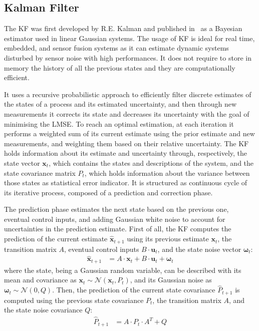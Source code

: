 \subsection{Kalman Filter}

\noindent The \gls{KF} was first developed by R.E. Kalman and published in~\cite{kalman} as a Bayesian estimator used in linear Gaussian systems.
The usage of \gls{KF} is ideal for real time, embedded, and sensor fusion systems as it can estimate dynamic systems disturbed by sensor noise with high performances.
It does not require to store in memory the history of all the previous states and they are computationally efficient.

It uses a recursive probabilistic approach to efficiently filter discrete estimates of the states of a process and its estimated uncertainty, and then through new measurements it corrects its state and decreases its uncertainty with the goal of minimising the \gls{LMSE}.
To reach an optimal estimation, at each iteration it performs a weighted sum of its current estimate using the prior estimate and new measurements, and weighting them based on their relative uncertainty.
The \gls{KF} holds information about its estimate and uncertainty through, respectively, the state vector $\mathbf{x}_t$, which contains the states and descriptions of the system, and the state covariance matrix $P_t$,  which holds information about the variance between those states as statistical error indicator.
It is structured as continuous cycle of its iterative process, composed of a prediction and correction phase.

The prediction phase estimates the next state based on the previous one, eventual control inputs, and adding Gaussian white noise to account for uncertainties in the prediction estimate.
First of all, the \gls{KF} computes the prediction of the current estimate $\hat{\mathbf{x}}_{t+1}$ using its previous estimate $\mathbf{x}_t $, the transition matrix $A$, eventual control inputs $B \cdot \mathbf{u}_t$, and the state noise vector $\boldsymbol \omega_t$:
\begin{align}
\hat{\mathbf{x}}_{t+1} & = A \cdot \mathbf{x}_t + B \cdot \mathbf{u}_t + \boldsymbol \omega_t
  \label{eq:pred-state}
\end{align}
where the state, being a Gaussian random variable, can be described with its mean and covariance as $\mathbf{x}_{t} \sim \mathcal{N}\left(\mathbf{x}_{t},P_{t}\right)$, and its Gaussian noise as $\boldsymbol \omega_t \sim \mathcal{N}\left(0, Q\right)$.
Then, the prediction of the current state covariance $\hat{P}_{t+1}$ is computed using the previous state covariance $P_t$, the transition matrix $A$, and the state noise covariance $Q$:
    \begin{align}
        \hat{P}_{t+1} & = A \cdot P_t \cdot A^T + Q
    \end{align}


